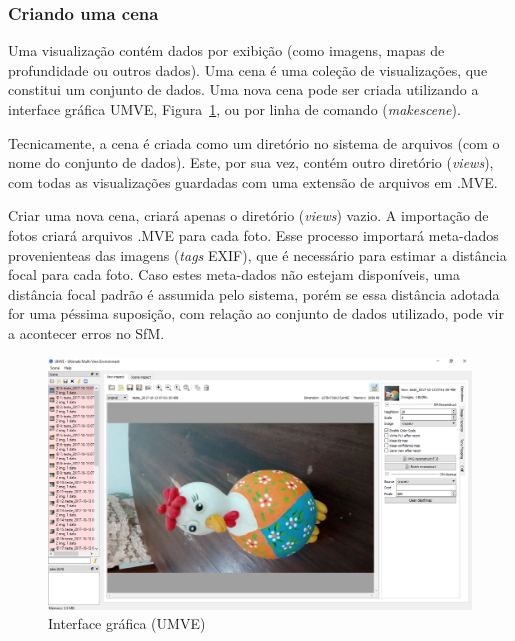 \subsubsection*{Criando uma cena}

Uma visualização contém dados por exibição (como imagens, mapas de profundidade
ou outros dados). Uma cena é uma coleção de visualizações, que constitui um
conjunto de dados. Uma nova cena pode ser criada utilizando a interface gráfica
UMVE, Figura~\ref{fig:umve:gui}, ou por linha de comando (\emph{makescene}). 

Tecnicamente, a cena é criada como um diretório no sistema de arquivos (com o nome do conjunto de dados). Este, por sua vez, contém outro diretório (\emph{views}), com todas as visualizações guardadas com uma extensão de arquivos em .MVE.

Criar uma nova cena, criará apenas o diretório (\emph{views}) vazio. A importação de fotos criará arquivos .MVE para cada foto. Esse processo importará meta-dados provenienteas das imagens (\emph{tags} EXIF), que é necessário para estimar a distância focal para cada foto. Caso estes meta-dados não estejam disponíveis, uma distância focal padrão é assumida pelo sistema, porém se essa distância adotada for uma péssima suposição, com relação ao conjunto de dados utilizado, pode vir a acontecer erros no SfM.

\begin{figure}[!h]
	\centering
	\includegraphics[width=\linewidth]{figs/umve1.png}
	\caption{%
	Interface gráfica (UMVE)%
	}\label{fig:umve:gui}
\end{figure}
